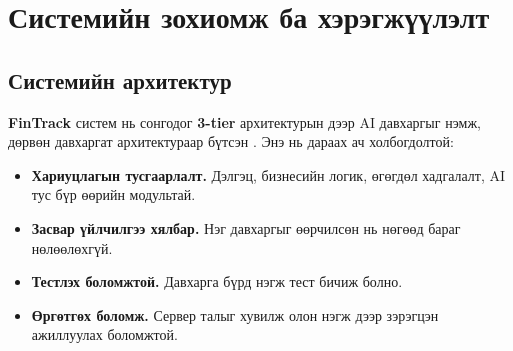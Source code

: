 ﻿%

\chapter{Системийн зохиомж ба хэрэгжүүлэлт}
\label{Chapter3}
\pagecolor{white}


\section{Системийн архитектур}
\textbf{FinTrack} систем нь сонгодог \textbf{3-tier} архитектурын дээр AI давхаргыг нэмж, дөрвөн давхаргат архитектураар бүтсэн \cite{cleanarch, ddd}. Энэ нь дараах ач холбогдолтой:
\begin{itemize}
    \item \textbf{Хариуцлагын тусгаарлалт.} Дэлгэц, бизнесийн логик, өгөгдөл хадгалалт, AI тус бүр өөрийн модультай.
    \item \textbf{Засвар үйлчилгээ хялбар.} Нэг давхаргыг өөрчилсөн нь нөгөөд бараг нөлөөлөхгүй.
    \item \textbf{Тестлэх боломжтой.} Давхарга бүрд нэгж тест бичиж болно.
    \item \textbf{Өргөтгөх боломж.} Сервер талыг хувилж олон нэгж дээр зэрэгцэн ажиллуулах боломжтой.
\end{itemize}

